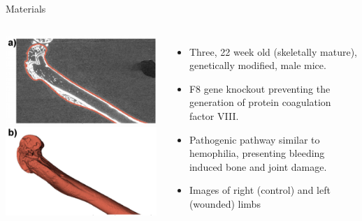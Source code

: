 \documentclass[10pt,aspectratio=169]{beamer}
\begin{document}
\begin{frame}[fragile]{Materials}
\begin{columns}[onlytextwidth]
    \centering
    \includegraphics[width=0.99\textwidth]{figures/bone_materials_femur_highlight.png}\\
    \vspace{0.5cm}
    \includegraphics[width=0.99\textwidth]{figures/bone_materials_femur_3D.png}
    \centering
    \begin{itemize} \itemsep1em
        \item Three, 22 week old (skeletally mature), genetically modified, male mice.

        \item F8 gene knockout preventing the generation of protein coagulation factor VIII.

        \item Pathogenic pathway similar to hemophilia, presenting bleeding induced bone and joint damage.

        \item Images of right (control) and left (wounded) limbs
    \end{itemize}
\end{columns}
\end{frame}
\end{document}
